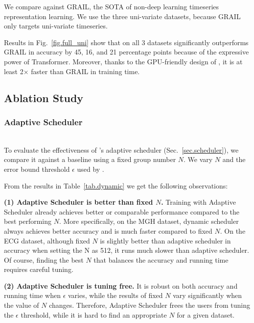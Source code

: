 We compare against GRAIL, the SOTA of non-deep learning timeseries representation learning. We use the three uni-variate datasets, because GRAIL only targets uni-variate timeseries.

Results in Fig.~\ref{fig.full_uni} show that on all 3 datasets \system significantly outperforms GRAIL in accuracy by 45, 16, and 21 percentage points because of the expressive power of Transformer.
Moreover, thanks to the GPU-friendly design of \system, it is at least 2$\times$ faster than GRAIL in training time.

\subsection{Ablation Study}
\label{sec.exp.ablation}

\subsubsection{Adaptive Scheduler\nopunct}\ \\
To evaluate the effectiveness of \system's adaptive scheduler (Sec.~\ref{sec.scheduler}), we compare it against a baseline using a fixed group number $N$. We vary $N$ and the error bound threshold $\epsilon$ used by \system.   

From the results in Table~\ref{tab.dynamic} we get the following observations: 

\textbf{(1) Adaptive Scheduler is better than fixed $N$.} Training with Adaptive Scheduler already achieves better or comparable performance compared to the best performing $N$. More specifically, on the MGH dataset, dynamic scheduler always achieves better accuracy and is much faster compared to fixed $N$.
On the ECG dataset, although fixed $N$ is slightly better than adaptive scheduler in accuracy when setting the N as 512, it runs much slower than adaptive scheduler. 
Of course, finding the best $N$ that balances the accuracy and running time requires careful tuning.  
 
\textbf{(2) Adaptive Scheduler is tuning free.} It is robust on both accuracy and running time when $\epsilon$ varies, while the results of fixed $N$ vary significantly when the value of $N$ changes.
Therefore, Adaptive Scheduler frees the users from tuning the $\epsilon$ threshold, while it is hard to find an appropriate $N$ for a given dataset.


